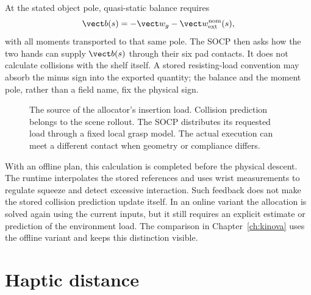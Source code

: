 At the stated object pole, quasi-static balance requires
\begin{equation}
\vect b(s)=-\vect w_g-\vect w_{\mathrm{ext}}^{\mathrm{nom}}(s),
\label{eq:insertion-load-source}
\end{equation}
with all moments transported to that same pole. The SOCP then asks how the two hands can supply $\vect b(s)$ through their six pad contacts. It does not calculate collisions with the shelf itself. A stored resisting-load convention may absorb the minus sign into the exported quantity; the balance and the moment pole, rather than a field name, fix the physical sign.

\begin{figure}[htbp]\centering
{}
\caption{The source of the allocator's insertion load. Collision prediction belongs to the scene rollout. The SOCP distributes its requested load through a fixed local grasp model. The actual execution can meet a different contact when geometry or compliance differs.}
\label{fig:insertion-load-blocks}
\end{figure}

With an offline plan, this calculation is completed before the physical descent. The runtime interpolates the stored references and uses wrist measurements to regulate squeeze and detect excessive interaction. Such feedback does not make the stored collision prediction update itself. In an online variant the allocation is solved again using the current inputs, but it still requires an explicit estimate or prediction of the environment load. The comparison in Chapter~\ref{ch:kinova} uses the offline variant and keeps this distinction visible.


\section{Haptic distance}

